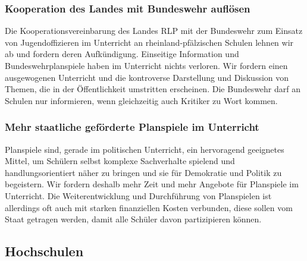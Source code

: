 \subsubsection{Kooperation des Landes mit Bundeswehr auflösen}
\abstimmung
Die Kooperationsvereinbarung des Landes RLP mit der Bundeswehr zum Einsatz von Jugendoffizieren im Unterricht an rheinland-pfälzischen Schulen lehnen wir ab und fordern deren Aufkündigung. Einseitige Information und Bundeswehrplanspiele haben im Unterricht nichts verloren. Wir fordern einen ausgewogenen Unterricht und die kontroverse Darstellung und Diskussion von Themen, die in der Öffentlichkeit umstritten erscheinen. Die Bundeswehr darf an Schulen nur informieren, wenn gleichzeitig auch Kritiker zu Wort kommen.
 
\label{wp:bildung:planspiele}

\subsubsection{Mehr staatliche geförderte Planspiele im Unterricht}
\abstimmung
Planspiele sind, gerade im politischen Unterricht, ein hervoragend geeignetes Mittel, um Schülern selbst komplexe Sachverhalte spielend und handlungsorientiert näher zu bringen und sie für Demokratie und Politik zu begeistern. Wir fordern deshalb mehr Zeit und mehr Angebote für Planspiele im Unterricht. Die Weiterentwicklung und Durchführung von Planspielen ist allerdings oft auch mit starken finanziellen Kosten verbunden, diese sollen vom Staat getragen werden, damit alle Schüler davon partizipieren können.
 
\newpage
\subsection*{Hochschulen}
\label{wp:bildung:zugang}

